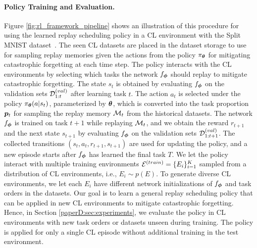 \paragraph{Policy Training and Evaluation.} Figure \ref{fig:rl_framework_pipeline} shows an illustration of this procedure for using the learned replay scheduling policy in a CL environment with the Split MNIST dataset~. The seen CL datasets are placed in the dataset storage to use for sampling replay memories given the actions from the policy $\pi_{{\bm{\theta}}}$ for mitigating catastrophic forgetting at each time step. The policy interacts with the CL environments by selecting which tasks the network $f_{{\bm{\phi}}}$ should replay to mitigate catastrophic forgetting. The state $s_t$ is obtained by evaluating $f_{{\bm{\phi}}}$ on the validation sets ${\mathcal{D}}_{1:t}^{(val)}$ after learning task $t$. The action $a_t$ is selected under the policy $\pi_{{\bm{\theta}}}(a | s_t)$, parameterized by ${\bm{\theta}}$, which is converted into the task proportion ${\bm{p}}_t$ for sampling the replay memory ${\mathcal{M}}_t$ from the historical datasets. The network $f_{{\bm{\phi}}}$ is trained on task $t+1$ while replaying ${\mathcal{M}}_t$, and we obtain the reward $r_{t+1}$ and the next state $s_{t+1}$ by evaluating $f_{{\bm{\phi}}}$ on the validation sets ${\mathcal{D}}_{1:t+1}^{(val)}$. The collected transitions $(s_t, a_t, r_{t+1}, s_{t+1})$ are used for updating the policy, and a new episode starts after $f_{{\bm{\phi}}}$ has learned the final task $T$. We let the policy interact with multiple training environments ${\mathcal{E}}^{(train)} = \{E_i\}_{i=1}^{K}$ sampled from a distribution of CL environments, i.e., $E_i \sim p(E)$. To generate diverse CL environments, we let each $E_i$ have different network initializations of $f_{{\bm{\phi}}}$ and task orders in the datasets. 
Our goal is to learn a general replay scheduling policy that can be applied in new CL environments to mitigate catastrophic forgetting. Hence, in Section \ref{paperD:sec:experiments}, we evaluate the policy in CL environments with new task orders or datasets unseen during training. The policy is applied for only a single CL episode without additional training in the test environment. 

\vspace{-3mm}
